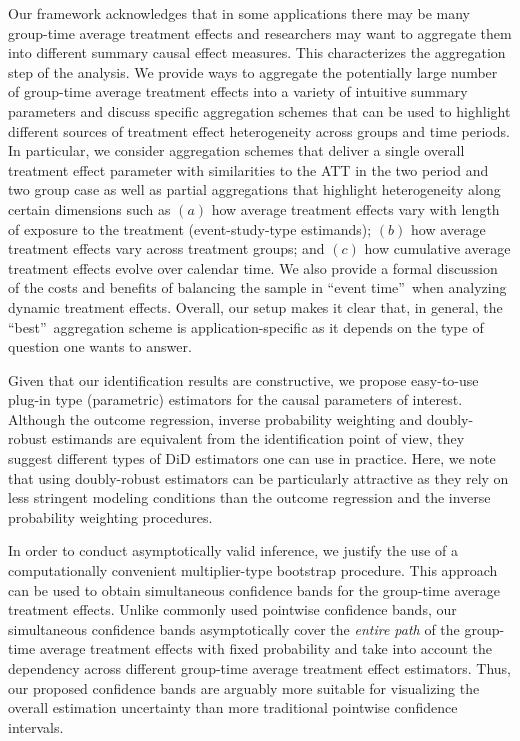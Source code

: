 \documentclass[11pt]{article}%
\theoremstyle{plain}
\numberwithin{sassumption}{section}
\numberwithin{equation}{section}
\begin{document}
Our framework acknowledges that in some applications there may be many
group-time average treatment effects and researchers may want to aggregate
them into different summary causal effect measures. This characterizes the
aggregation step of the analysis. We provide ways to aggregate the potentially
large number of group-time average treatment effects into a variety of
intuitive summary parameters and discuss specific aggregation schemes that can
be used to highlight different sources of treatment effect heterogeneity
across groups and time periods. In particular, we consider aggregation schemes
that deliver a single overall treatment effect parameter with similarities to
the ATT in the two period and two group case as well as partial aggregations
that highlight heterogeneity along certain dimensions such as $\left(
a\right)  $ how average treatment effects vary with length of exposure to the
treatment (event-study-type estimands); $\left(  b\right)  $ how average
treatment effects vary across treatment groups; and $\left(  c\right)  $ how
cumulative average treatment effects evolve over calendar time. We also
provide a formal discussion of the costs and benefits of balancing the sample
in \textquotedblleft event time\textquotedblright\ when analyzing dynamic
treatment effects. Overall, our setup makes it clear that, in general, the
\textquotedblleft best\textquotedblright\ aggregation scheme is
application-specific as it depends on the type of question one wants to answer.

Given that our identification results are constructive, we propose easy-to-use
plug-in type (parametric) estimators for the causal parameters of interest.
Although the outcome regression, inverse probability weighting and
doubly-robust estimands are equivalent from the identification point of view,
they suggest different types of DiD estimators one can use in practice. Here,
we note that using doubly-robust estimators can be particularly attractive as
they rely on less stringent modeling conditions than the outcome regression
and the inverse probability weighting procedures.

In order to conduct asymptotically valid inference, we justify the use of a
computationally convenient multiplier-type bootstrap procedure. This approach
can be used to obtain simultaneous confidence bands for the group-time average
treatment effects. Unlike commonly used pointwise confidence bands, our
simultaneous confidence bands asymptotically cover the \textit{entire path} of
the group-time average treatment effects with {fixed probability} and take
into account the dependency across different group-time average treatment
effect estimators. Thus, our proposed confidence bands are arguably more
suitable for visualizing the overall estimation uncertainty than more
traditional pointwise confidence intervals.
\end{document}

